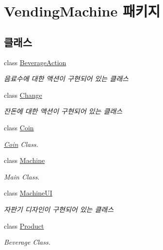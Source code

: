 \hypertarget{namespace_vending_machine}{}\section{Vending\+Machine 패키지}
\label{namespace_vending_machine}
\subsection*{클래스}
\begin{DoxyCompactItemize}
\item 
class \hyperlink{class_vending_machine_1_1_beverage_action}{Beverage\+Action}
\begin{DoxyCompactList}\small\item\em 음료수에 대한 액션이 구현되어 있는 클래스 \end{DoxyCompactList}\item 
class \hyperlink{class_vending_machine_1_1_change}{Change}
\begin{DoxyCompactList}\small\item\em 잔돈에 대한 액션이 구현되어 있는 클래스 \end{DoxyCompactList}\item 
class \hyperlink{class_vending_machine_1_1_coin}{Coin}
\begin{DoxyCompactList}\small\item\em \hyperlink{class_vending_machine_1_1_coin}{Coin} Class. \end{DoxyCompactList}\item 
class \hyperlink{class_vending_machine_1_1_machine}{Machine}
\begin{DoxyCompactList}\small\item\em Main Class. \end{DoxyCompactList}\item 
class \hyperlink{class_vending_machine_1_1_machine_u_i}{Machine\+UI}
\begin{DoxyCompactList}\small\item\em 자판기 디자인이 구현되어 있는 클래스 \end{DoxyCompactList}\item 
class \hyperlink{class_vending_machine_1_1_product}{Product}
\begin{DoxyCompactList}\small\item\em Beverage Class. \end{DoxyCompactList}\end{DoxyCompactItemize}
